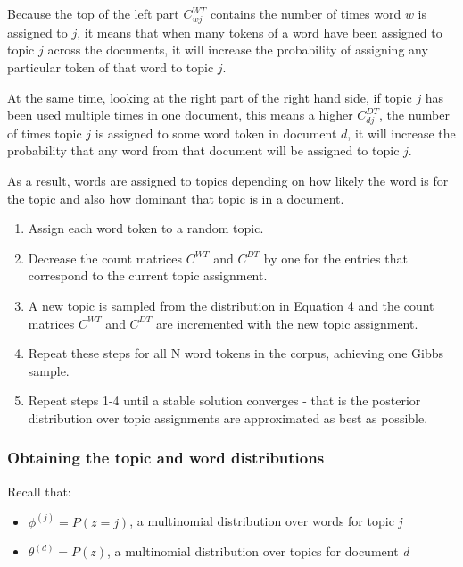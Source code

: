 \documentclass[
]{article}
\providecommand{\tightlist}{%
  \setlength{\itemsep}{0pt}\setlength{\parskip}{0pt}}
\begin{document}
Because the top of the left part \(C^{WT}_{wj}\) contains the number of
times word \(w\) is assigned to \(j\), it means that when many tokens of
a word have been assigned to topic \(j\) across the documents, it will
increase the probability of assigning any particular token of that word
to topic \(j\).

At the same time, looking at the right part of the right hand side, if
topic \(j\) has been used multiple times in one document, this means a
higher \(C^{DT}_{dj}\), the number of times topic \(j\) is assigned to
some word token in document \(d\), it will increase the probability that
any word from that document will be assigned to topic \(j\).

As a result, words are assigned to topics depending on how likely the
word is for the topic and also how dominant that topic is in a document.

\begin{enumerate}
\def\labelenumi{\arabic{enumi}.}
\tightlist
\item
  Assign each word token to a random topic.
\item
  Decrease the count matrices \(C^{WT}\) and \(C^{DT}\) by one for the
  entries that correspond to the current topic assignment.
\item
  A new topic is sampled from the distribution in Equation 4 and the
  count matrices \(C^{WT}\) and \(C^{DT}\) are incremented with the new
  topic assignment.
\item
  Repeat these steps for all N word tokens in the corpus, achieving one
  Gibbs sample.
\item
  Repeat steps 1-4 until a stable solution converges - that is the
  posterior distribution over topic assignments are approximated as best
  as possible.
\end{enumerate}

\hypertarget{obtaining-the-topic-and-word-distributions}{%
\subsubsection{Obtaining the topic and word
distributions}\label{obtaining-the-topic-and-word-distributions}}

Recall that:

\begin{itemize}
\tightlist
\item
  \({\phi}^{(j)} = P(z=j)\), a multinomial distribution over words for
  topic \emph{j}
\item
  \({\theta}^{(d)} = P(z)\), a multinomial distribution over topics for
  document \emph{d}
\end{itemize}
\end{document}
